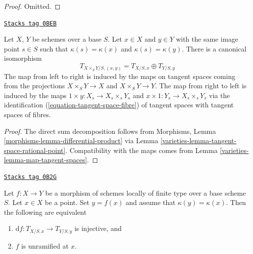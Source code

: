 \begin{proof}
Omitted.
\end{proof}

\begin{lemma}
\label{varieties-lemma-tangent-space-product}
\href{https://stacks.math.columbia.edu/tag/0BEB}{\texttt{Stacks tag 0BEB}}

Let $X$, $Y$ be schemes over a base $S$. Let $x \in X$ and $y \in Y$ with
the same image point $s \in S$ such that $\kappa(s) = \kappa(x)$ and
$\kappa(s) = \kappa(y)$. There is a canonical isomorphism
$$
T_{X \times_S Y/S, (x, y)} = T_{X/S, x} \oplus T_{Y/S, y}
$$
The map from left to right is induced by the maps on tangent spaces coming
from the projections $X \times_S Y \to X$ and $X \times_S Y \to Y$.
The map from right to left is induced by the maps
$1 \times y : X_s \to X_s \times_s Y_s$ and
$x \times 1 : Y_s \to X_s \times_s Y_s$ via the identification
(\ref{equation-tangent-space-fibre}) of
tangent spaces with tangent spaces of fibres.
\end{lemma}

\begin{proof}

The direct sum decomposition follows from
Morphisms, Lemma \ref{morphisms-lemma-differential-product}
via Lemma \ref{varieties-lemma-tangent-space-rational-point}. Compatibility
with the maps comes from Lemma \ref{varieties-lemma-map-tangent-spaces}.
\end{proof}

\begin{lemma}
\label{varieties-lemma-injective-tangent-spaces-unramified}
\href{https://stacks.math.columbia.edu/tag/0B2G}{\texttt{Stacks tag 0B2G}}

Let $f : X \to Y$ be a morphism of schemes locally of finite type over a
base scheme $S$. Let $x \in X$ be a point. Set $y = f(x)$ and assume
that $\kappa(y) = \kappa(x)$. Then the following are equivalent
\begin{enumerate}
\item $\text{d}f : T_{X/S, x} \longrightarrow T_{Y/S, y}$ is injective, and
\item $f$ is unramified at $x$.
\end{enumerate}
\end{lemma}

